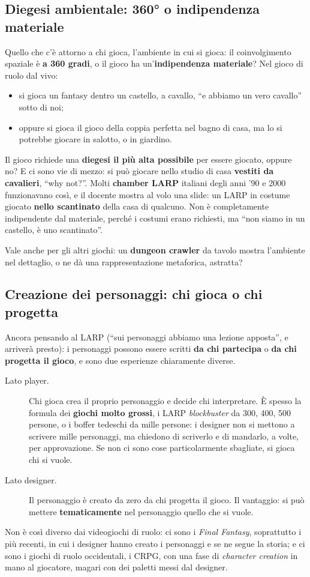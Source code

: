 \subsection{Diegesi ambientale: 360° o indipendenza materiale}

Quello che c'è attorno a chi gioca, l'ambiente in cui si gioca: il coinvolgimento
spaziale è \textbf{a 360 gradi}, o il gioco ha un'\textbf{indipendenza
materiale}? Nel gioco di ruolo dal vivo:
\begin{itemize}
  \item si gioca un fantasy dentro un castello, a cavallo, ``e abbiamo un vero
        cavallo'' sotto di noi;
  \item oppure si gioca il gioco della coppia perfetta nel bagno di casa, ma
        lo si potrebbe giocare in salotto, o in giardino.
\end{itemize}
Il gioco richiede una \textbf{diegesi il più alta possibile} per essere giocato,
oppure no? E ci sono vie di mezzo: si può giocare nello studio di casa
\textbf{vestiti da cavalieri}, ``why not?''. Molti \textbf{chamber LARP} italiani
degli anni '90 e 2000 funzionavano così, e il docente mostra al volo una slide:
un LARP in costume giocato \textbf{nello scantinato} della casa di qualcuno. Non è
completamente indipendente dal materiale, perché i costumi erano richiesti, ma
``non siamo in un castello, è uno scantinato''.

Vale anche per gli altri giochi: un \textbf{dungeon crawler} da tavolo mostra
l'ambiente nel dettaglio, o ne dà una rappresentazione metaforica, astratta?

\subsection{Creazione dei personaggi: chi gioca o chi progetta}

Ancora pensando al LARP (``sui personaggi abbiamo una lezione apposta'', e
arriverà presto): i personaggi possono essere scritti \textbf{da chi partecipa}
o \textbf{da chi progetta il gioco}, e sono due esperienze chiaramente diverse.
\begin{description}
  \item[Lato player.] Chi gioca crea il proprio personaggio e decide chi
        interpretare. È spesso la formula dei \textbf{giochi molto grossi}, i
        LARP \emph{blockbuster} da 300, 400, 500 persone, o i boffer tedeschi da
        mille persone: i designer non si mettono a scrivere mille personaggi, ma
        chiedono di scriverlo e di mandarlo, a volte, per approvazione. Se non ci
        sono cose particolarmente sbagliate, si gioca chi si vuole.
  \item[Lato designer.] Il personaggio è creato da zero da chi progetta il
        gioco. Il vantaggio: si può mettere \textbf{tematicamente} nel
        personaggio quello che si vuole.
\end{description}
Non è così diverso dai videogiochi di ruolo: ci sono i \emph{Final Fantasy},
soprattutto i più recenti, in cui i designer hanno creato i personaggi e se ne
segue la storia; e ci sono i giochi di ruolo occidentali, i CRPG, con una fase
di \emph{character creation} in mano al giocatore, magari con dei paletti messi
dal designer.

